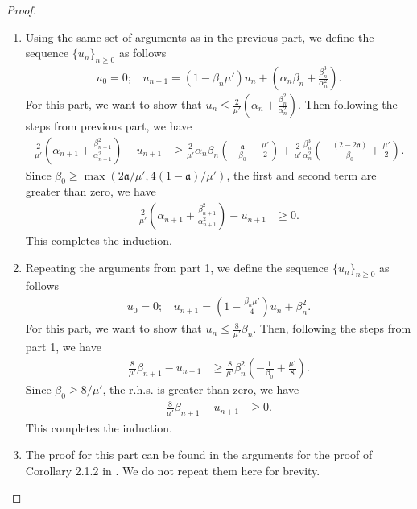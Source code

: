 \documentclass[letterpaper, 10 pt, conference]{ieeeconf}  %
\theoremstyle{definition}
\theoremstyle{plain}
\newcommand{\afrak}{\mathfrak{a}}
\begin{document}
\begin{proof}
\begin{enumerate}
\begin{align*}
            &\geq 0
        \end{align*}
        where the last inequality follows from $n\geq n_I=\max(2[\afrak/(\lambda'\alpha_0)]^{1/(1-\afrak)}, 2[(2-2\afrak)/(\lambda'\beta_0^2)]^{1/(2\afrak-1)})$. Thus, by induction $u_n\leq \frac{2}{\lambda'}\left(\alpha_n+\frac{\beta_n^2}{\alpha_n^2}\right)$.
        \item Using the same set of arguments as in the previous part, we define the sequence $\{u_n\}_{n\geq 0}$ as follows
        \begin{align*}
            u_0=0;~~~~u_{n+1}=(1-\beta_n\mu')u_n+\left(\alpha_n\beta_n+\frac{\beta_n^3}{\alpha_n^2}\right).
        \end{align*}
        For this part, we want to show that $u_n\leq\frac{2}{\mu'}\left(\alpha_n+\frac{\beta_n^2}{\alpha_n^2}\right)$. Then following the steps from previous part, we have
        \begin{align*}
            \frac{2}{\mu'}\left(\alpha_{n+1}+\frac{\beta_{n+1}^2}{\alpha_{n+1}^2}\right)-u_{n+1}&\geq \frac{2}{\mu'}\alpha_n\beta_n\left(-\frac{\afrak}{\beta_0}+\frac{\mu'}{2}\right)+\frac{2}{\mu'}\frac{\beta_n^3}{\alpha_n^2}\left(-\frac{(2-2\afrak)}{\beta_0}+\frac{\mu'}{2}\right).
        \end{align*}
        Since $\beta_0\geq \max(2\afrak/\mu', 4(1-\afrak)/\mu')$, the first and second term are greater than zero, we have
        \begin{align*}
            \frac{2}{\mu'}\left(\alpha_{n+1}+\frac{\beta_{n+1}^2}{\alpha_{n+1}^2}\right)-u_{n+1}&\geq 0.
        \end{align*} 
        This completes the induction.
        \item Repeating the arguments from part 1, we define the sequence $\{u_n\}_{n\geq 0}$ as follows
        \begin{align*}
            u_0=0;~~~~u_{n+1}=\left(1-\frac{\beta_n\mu'}{4}\right)u_n+\beta_n^2.
        \end{align*}
        For this part, we want to show that $u_n\leq\frac{8}{\mu'}\beta_n$. Then, following the steps from part 1, we have
        \begin{align*}
            \frac{8}{\mu'}\beta_{n+1}-u_{n+1}&\geq \frac{8}{\mu'}\beta_n^2\left(-\frac{1}{\beta_0}+\frac{\mu'}{8}\right).
        \end{align*}
        Since $\beta_0\geq 8/\mu'$, the r.h.s. is greater than zero, we have
        \begin{align*}
            \frac{8}{\mu'}\beta_{n+1}-u_{n+1}&\geq 0.
        \end{align*}
        This completes the induction.
        \item The proof for this part can be found in the arguments for the proof of Corollary 2.1.2 in \cite{chenfinite}. We do not repeat them here for brevity.
    \end{enumerate}
\end{proof}
\end{document}
